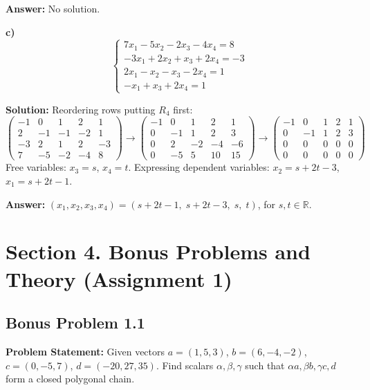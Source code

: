 \documentclass[11pt, a4paper]{article}
\begin{document}
\textbf{Answer:} No solution.

\medskip
\textbf{c)}
$$ \begin{cases} 7x_1 - 5x_2 - 2x_3 - 4x_4 = 8 \\ -3x_1 + 2x_2 + x_3 + 2x_4 = -3 \\ 2x_1 - x_2 - x_3 - 2x_4 = 1 \\ -x_1 + x_3 + 2x_4 = 1 \end{cases} $$

\textbf{Solution:} Reordering rows putting $R_4$ first:
$$ \left(\begin{array}{cccc|c} -1 & 0 & 1 & 2 & 1 \\ 2 & -1 & -1 & -2 & 1 \\ -3 & 2 & 1 & 2 & -3 \\ 7 & -5 & -2 & -4 & 8 \end{array}\right) \to \left(\begin{array}{cccc|c} -1 & 0 & 1 & 2 & 1 \\ 0 & -1 & 1 & 2 & 3 \\ 0 & 2 & -2 & -4 & -6 \\ 0 & -5 & 5 & 10 & 15 \end{array}\right) \to \left(\begin{array}{cccc|c} -1 & 0 & 1 & 2 & 1 \\ 0 & -1 & 1 & 2 & 3 \\ 0 & 0 & 0 & 0 & 0 \\ 0 & 0 & 0 & 0 & 0 \end{array}\right) $$
Free variables: $x_3 = s$, $x_4 = t$. Expressing dependent variables: $x_2 = s + 2t - 3$, $x_1 = s + 2t - 1$.

\textbf{Answer:} $(x_1, x_2, x_3, x_4) = (s + 2t - 1, \; s + 2t - 3, \; s, \; t)$, for $s, t \in \mathbb{R}$.

\newpage

\section{Section 4. Bonus Problems and Theory (Assignment 1)}

\subsection*{Bonus Problem 1.1}
\textbf{Problem Statement:} Given vectors $a=(1,5,3)$, $b=(6,-4,-2)$, $c=(0,-5,7)$, $d=(-20,27,35)$. Find scalars $\alpha, \beta, \gamma$ such that $\alpha a, \beta b, \gamma c, d$ form a closed polygonal chain.
\end{document}
